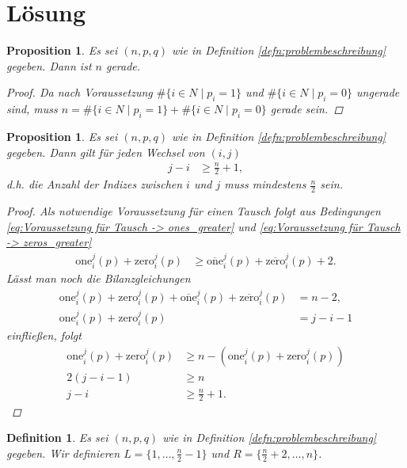 \documentclass[12pt]{article}
\newtheorem{defn}[thm]{Definition}
\newtheorem{prop}[thm]{Proposition}
\begin{document}
\section{Lösung}
\begin{prop}
Es sei $(n, p, q)$ wie in Definition \ref{defn:problembeschreibung} gegeben. Dann ist $n$ gerade.
\begin{proof}
Da nach Voraussetzung $\#\{ i \in N\mid p_i=1 \}$ und $\#\{ i \in N\mid p_i=0 \}$ ungerade sind, muss $n=\#\{ i \in N\mid p_i=1 \} + \#\{ i \in N\mid p_i=0 \}$ gerade sein.
\end{proof}
\end{prop}


\begin{prop}
Es sei $(n, p, q)$ wie in Definition \ref{defn:problembeschreibung} gegeben. Dann gilt für jeden Wechsel von $(i, j)$
\begin{align}
j-i
&\geq \frac{n}{2}+1,
\label{eq:j-i>n/2}
\end{align} 
d.h. die Anzahl der Indizes zwischen $i$ und $j$ muss mindestens $\frac{n}{2}$ sein.
\begin{proof}
Als notwendige Voraussetzung für einen Tausch folgt aus Bedingungen \ref{eq:Voraussetzung für Tausch -> ones_greater} und \ref{eq:Voraussetzung für Tausch -> zeros_greater}
\begin{align*}
\mathrm{one}_i^{j}(p) + \mathrm{zero}_i^{j}(p)
&\geq
\overline{\mathrm{one}}_i^{j}(p) + \overline{\mathrm{zero}}_i^{j}(p) + 2.
\end{align*}
Lässt man noch die Bilanzgleichungen
\begin{align*}
\mathrm{one}_i^{j}(p) + \mathrm{zero}_i^{j}(p)
+
\overline{\mathrm{one}}_i^{j}(p) + \overline{\mathrm{zero}}_i^{j}(p) 
&=
n-2,
\\
\mathrm{one}_i^{j}(p) + \mathrm{zero}_i^{j}(p)
&=
j-i-1
\end{align*}
einfließen, folgt
\begin{align*}
\mathrm{one}_i^{j}(p) + \mathrm{zero}_i^{j}(p)
&\geq
n- (\mathrm{one}_i^{j}(p) + \mathrm{zero}_i^{j}(p))
\\
2(j-i-1)
&\geq
n
\\
j-i
&\geq \frac{n}{2}+1.
\end{align*}
\end{proof}
\end{prop}

\begin{defn}
Es sei $(n, p, q)$ wie in Definition \ref{defn:problembeschreibung} gegeben.
Wir definieren $L=\{1,\dots, \frac{n}{2}-1\}$ und $R=\{\frac{n}{2}+2,\dots, n\}$.
\end{defn}
\end{document}

